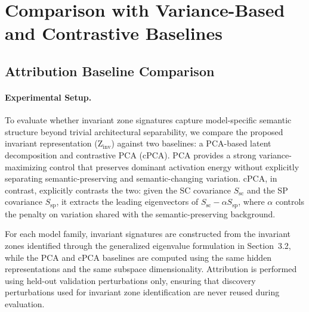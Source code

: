 \section{Comparison with Variance-Based and Contrastive Baselines} %
\label{app:comparison}

\subsection{Attribution Baseline Comparison}
\label{app:attribution_baseline}

\paragraph{Experimental Setup.}

To evaluate whether invariant zone signatures capture model-specific semantic structure beyond trivial architectural separability, we compare the proposed invariant representation (Z$_{\mathrm{inv}}$) against two baselines: a PCA-based latent decomposition and contrastive PCA (cPCA). PCA provides a strong variance-maximizing control that preserves dominant activation energy without explicitly separating semantic-preserving and semantic-changing variation. cPCA, in contrast, explicitly contrasts the two: given the SC covariance $S_{\mathrm{sc}}$ and the SP covariance $S_{\mathrm{sp}}$, it extracts the leading eigenvectors of $S_{\mathrm{sc}} - \alpha S_{\mathrm{sp}}$, where $\alpha$ controls the penalty on variation shared with the semantic-preserving background. %

For each model family, invariant signatures are constructed from the invariant zones identified through the generalized eigenvalue formulation in Section~3.2,
while the PCA and cPCA %
baselines are computed using the same hidden representations and the same subspace dimensionality.
Attribution is performed using held-out validation perturbations only, ensuring that discovery perturbations used for invariant zone identification are never reused during evaluation.

